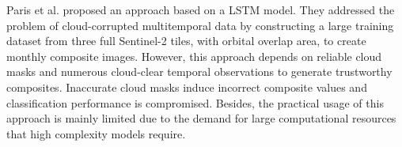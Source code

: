 \documentclass[journal,article,submit,pdftex,moreauthors]{Definitions/mdpi}
\begin{document}

Paris et al. \cite{Paris2020} 
proposed an approach based on a LSTM model.
They addressed the problem of cloud-corrupted multitemporal data by constructing a large training dataset from three full Sentinel-2 tiles, with orbital overlap area, to create monthly composite images. However, this approach depends on reliable cloud masks and numerous cloud-clear temporal observations to generate trustworthy composites. Inaccurate cloud masks induce incorrect composite values and classification performance is compromised. Besides, the practical usage of this approach is mainly limited due to the demand for large computational resources that high complexity models require.

\end{document}
